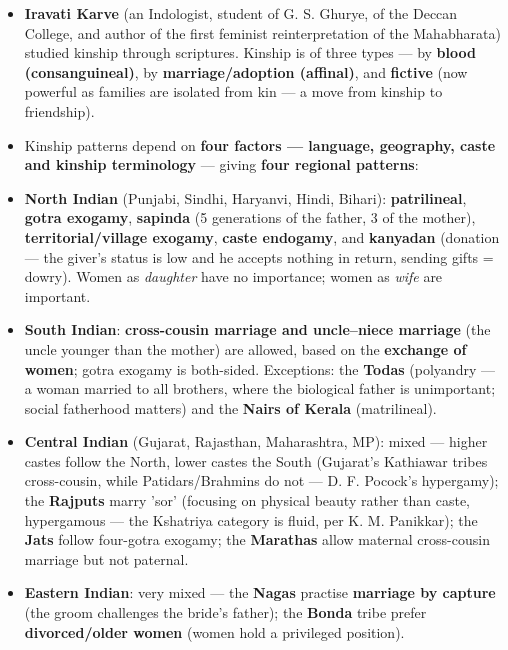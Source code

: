 \begin{KeyConcept}
\begin{itemize}
\item \textbf{Iravati Karve} (an Indologist, student of G. S. Ghurye, of the Deccan College, and author of the first feminist reinterpretation of the Mahabharata) studied kinship through scriptures. Kinship is of three types --- by \textbf{blood (consanguineal)}, by \textbf{marriage/adoption (affinal)}, and \textbf{fictive} (now powerful as families are isolated from kin --- a move from kinship to friendship).
\item Kinship patterns depend on \textbf{four factors --- language, geography, caste and kinship terminology} --- giving \textbf{four regional patterns}:
\item \textbf{North Indian} (Punjabi, Sindhi, Haryanvi, Hindi, Bihari): \textbf{patrilineal}, \textbf{gotra exogamy}, \textbf{sapinda} (5 generations of the father, 3 of the mother), \textbf{territorial/village exogamy}, \textbf{caste endogamy}, and \textbf{kanyadan} (donation --- the giver's status is low and he accepts nothing in return, sending gifts = dowry). Women as \emph{daughter} have no importance; women as \emph{wife} are important.
\item \textbf{South Indian}: \textbf{cross-cousin marriage and uncle--niece marriage} (the uncle younger than the mother) are allowed, based on the \textbf{exchange of women}; gotra exogamy is both-sided. Exceptions: the \textbf{Todas} (polyandry --- a woman married to all brothers, where the biological father is unimportant; social fatherhood matters) and the \textbf{Nairs of Kerala} (matrilineal).
\item \textbf{Central Indian} (Gujarat, Rajasthan, Maharashtra, MP): mixed --- higher castes follow the North, lower castes the South (Gujarat's Kathiawar tribes cross-cousin, while Patidars/Brahmins do not --- D. F. Pocock's hypergamy); the \textbf{Rajputs} marry 'sor' (focusing on physical beauty rather than caste, hypergamous --- the Kshatriya category is fluid, per K. M. Panikkar); the \textbf{Jats} follow four-gotra exogamy; the \textbf{Marathas} allow maternal cross-cousin marriage but not paternal.
\item \textbf{Eastern Indian}: very mixed --- the \textbf{Nagas} practise \textbf{marriage by capture} (the groom challenges the bride's father); the \textbf{Bonda} tribe prefer \textbf{divorced/older women} (women hold a privileged position).
\end{itemize}
\end{KeyConcept}


